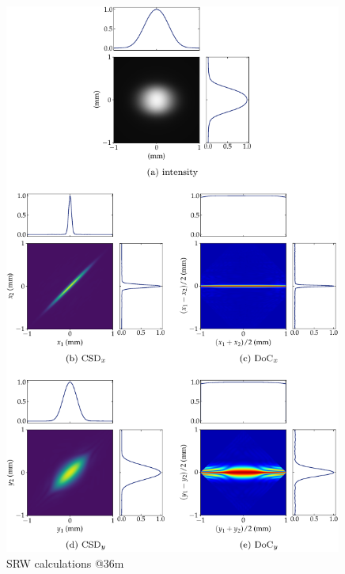 \documentclass{iucr}              %
\begin{document}
\newpage

\begin{figure}
    \label{fig:CSD_SRW_36m}
    \includegraphics[width=0.99\textwidth]{SRW_CSD_36m.pdf}
    \caption{SRW calculations @36m}
\end{figure}
\end{document}

